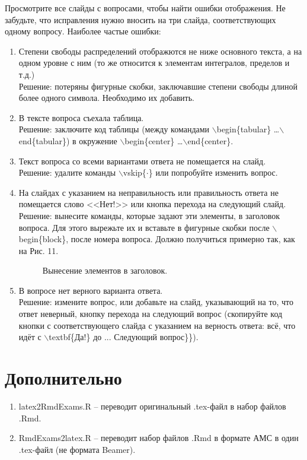 \documentclass[11pt, a4paper]{extarticle}
\newcommand{\code}[1]{{\color{blue} #1}}
\newcommand{\form}[1]{{\color{magenta} #1}}
\begin{document}
Просмотрите все слайды с вопросами, чтобы найти ошибки отображения. Не забудьте, что исправления нужно вносить на три слайда, соответствующих одному вопросу. Наиболее частые ошибки:
	\begin{enumerate}
			\item Степени свободы распределений отображются не ниже основного текста, а на одном уровне с ним (то же относится к элементам интегралов, пределов и т.д.) \\
			Решение: потеряны фигурные скобки, заключавшие степени свободы длиной более одного символа. Необходимо их добавить.
			\item В тексте вопроса съехала таблица. \\
			Решение: заключите код таблицы (между командами \code{$\backslash$begin\{tabular\} \ldots $\backslash$end\{tabular\}}) в окружение \code{$\backslash$begin\{center\} \ldots $\backslash$end\{center\}}.
			\item Текст вопроса со всеми вариантами ответа не помещается на слайд. \\
			Решение: удалите команды \code{$\backslash$vskip\{$\cdot$\}} или попробуйте изменить вопрос.
			\item На слайдах с указанием на неправильность или правильность ответа не помещается слово <<Нет!>> или кнопка перехода на следующий слайд. \\
			Решение: вынесите команды, которые задают эти элементы, в заголовок вопроса. Для этого вырежьте их и вставьте в фигурные скобки после \code{$\backslash$begin\{block\}}, после номера вопроса. Должно получиться примерно так, как на Рис. 11.
			\begin{figure}[h!]
				\centering
				\caption{Вынесение элементов в заголовок.}
			\end{figure}
			\item В вопросе нет верного варианта ответа. \\
			Решение: измените вопрос, или добавьте на слайд, указывающий на то, что ответ неверный, кнопку перехода на следующий вопрос (скопируйте код кнопки с соответствующего слайда с указанием на верность ответа: всё, что идёт с \code{$\backslash$textbf\{Да!\}} до \code{... Следующий вопрос\}\}}).
	\end{enumerate}

\section{Дополнительно}

\begin{enumerate}
	\item \form{latex2RmdExams.R} – переводит оригинальный \form{.tex}-файл в набор файлов \form{.Rmd}.
	\item \form{RmdExams2latex.R} – переводит набор файлов \form{.Rmd} в формате \form{АМС} в один \form{.tex}-файл (не формата Beamer).
\end{enumerate}
\end{document}
